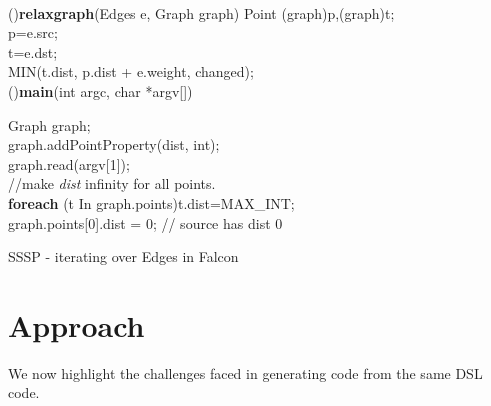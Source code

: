 \documentclass[12pt]{article}
\begin{document}
\begin{algorithm}
\small
{}
\fontsize{10pt}{7pt}\\
\Fn(){\textbf{relaxgraph}(Edges  e, Graph  graph)} {\label{line:efundef}
        Point (graph)p,(graph)t;\\
    p=e.src;\\
    t=e.dst;\\
    MIN(t.dist, p.dist + e.weight, changed);    \label{line:emodidist}\\%
}
\Fn(){\textbf{main}(int argc, char *argv[])} {
        Graph graph;    \\
        graph.addPointProperty(dist, int);      \label{line:eadd-dist}\\
        graph.read(argv[1]);            \label{line:ereadgraph}  \\
        //make {\it dist} infinity for all points.\\
        \textbf{foreach} (t In graph.points)t.dist=MAX\_INT;     \label{line:einfinity}\\
        graph.points[0].dist = 0;       // source has dist 0    \label{line:einitsource} \\
        \label{ssspendlopp}

        }
\caption{SSSP - iterating over Edges in Falcon}
\label{background:algo2}
        \end{algorithm}



\section{Approach}\label{sec:approach}
We now highlight the challenges faced in generating code from the same DSL code.
\end{document}
